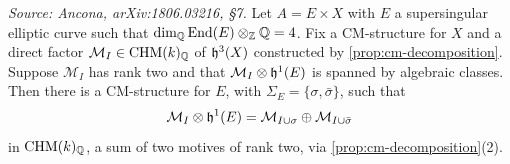 \begin{lemma}
  \label{lem:exotic-split}
  \textit{Source: Ancona, arXiv:1806.03216, §7.}
  Let \(A = E \times X\) with \(E\) a supersingular elliptic curve such that
  \(\dim_{\mathbb{Q}} \mathrm{End}(E) \otimes_{\mathbb{Z}} \mathbb{Q} = 4\). Fix a CM-structure for \(X\) and a direct
  factor \(\mathcal{M}_I \in \mathrm{CHM}(k)_{\mathbb{Q}}\) of \(\mathfrak{h}^3(X)\) constructed by
  \cref{prop:cm-decomposition}. Suppose \(\mathcal{M}_I\) has rank two and that
  \(\mathcal{M}_I \otimes \mathfrak{h}^1(E)\) is spanned by algebraic classes. Then there
  is a CM-structure for \(E\), with \(\Sigma_E = \{\sigma, \bar\sigma\}\), such
  that
  \[\mathcal{M}_I \otimes \mathfrak{h}^1(E) =
    \mathcal{M}_{I \cup \sigma} \oplus \mathcal{M}_{I \cup \bar\sigma}\]
  in \(\mathrm{CHM}(k)_{\mathbb{Q}}\), a sum of two motives of rank two, via
  \cref{prop:cm-decomposition}(2).
\end{lemma}

